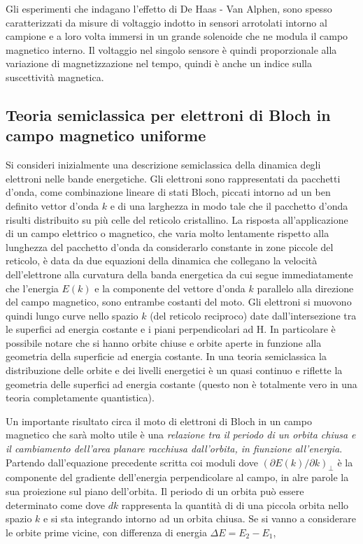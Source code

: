 Gli esperimenti che indagano l'effetto di De Haas - Van Alphen, sono spesso caratterizzati da misure di voltaggio indotto in sensori arrotolati intorno al campione e a loro volta immersi in un grande solenoide che ne modula il campo magnetico interno. Il voltaggio nel singolo sensore \`e quindi proporzionale alla variazione di magnetizzazione nel tempo, quindi \`e anche un indice sulla suscettivit\`a magnetica. 
\subsection{Teoria semiclassica per elettroni di Bloch in campo magnetico uniforme}
Si consideri inizialmente una descrizione semiclassica della dinamica degli elettroni nelle bande energetiche. Gli elettroni sono rappresentati da pacchetti d'onda, come combinazione lineare di stati Bloch, piccati intorno ad un ben definito vettor d'onda $k$ e di una larghezza in modo tale che il pacchetto d'onda risulti distribuito su pi\`u celle del reticolo cristallino. La risposta all'applicazione di un campo elettrico o magnetico, che varia molto lentamente rispetto alla lunghezza del pacchetto d'onda da considerarlo constante in zone piccole del reticolo, \`e data da due equazioni della dinamica che collegano la velocit\`a dell'elettrone alla curvatura della banda energetica
da cui segue immediatamente che l'energia $E(k)$ e la componente  del vettore d'onda $k$ parallelo alla direzione del campo magnetico, sono entrambe costanti del moto. Gli elettroni si muovono quindi lungo curve nello spazio $k$ (del reticolo reciproco) date dall'intersezione tra le superfici ad energia costante e i piani perpendicolari ad H. In particolare \`e possibile notare che si hanno orbite chiuse e orbite aperte in funzione alla geometria della superficie ad energia costante. In una teoria semiclassica la distribuzione delle orbite e dei livelli energetici \`e un quasi continuo e riflette la geometria delle superfici ad energia costante (questo non \`e totalmente vero in una teoria completamente quantistica).

Un importante risultato circa il moto di elettroni di Bloch in un campo magnetico che sar\`a molto utile \`e una \textit{relazione tra il periodo di un orbita chiusa e il cambiamento dell'area planare racchiusa dall'orbita, in fiunzione all'energia}. Partendo dall'equazione precedente scritta coi moduli
dove $(\partial E(k)/ \partial k)_\perp$ \`e la componente del gradiente dell'energia perpendicolare al campo, in alre parole la sua proiezione sul piano dell'orbita. Il periodo di un orbita pu\`o essere determinato come 
dove  $dk$ rappresenta la quantit\`a di di una piccola orbita nello spazio $k$ e si sta integrando intorno ad un orbita chiusa. Se si vanno a considerare le orbite prime vicine, con differenza di energia $\Delta E = E_2-E_1$, 


